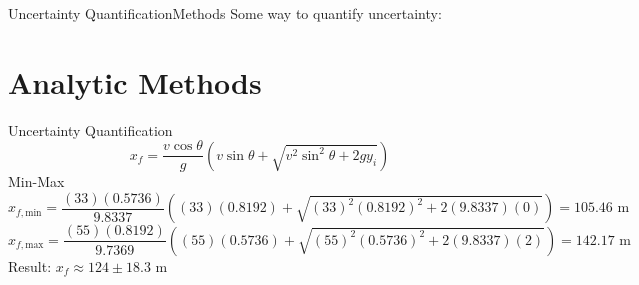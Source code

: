 \documentclass{beamer}
\begin{document}
\begin{frame}{Uncertainty Quantification}{Methods}\vspace{-20pt}
Some way to quantify uncertainty:
\end{frame}

\section{Analytic Methods}
\begin{frame}{Uncertainty Quantification}\vspace{-20pt}
\[x_f=\frac{v\cos{\theta}}{g}\left(v\sin\theta+\sqrt{v^2\sin^2\theta + 2gy_i}\right)\]
Min-Max
\tiny
\[x_{f,\text{min}}=\frac{(33)(0.5736)}{9.8337}\left((33)(0.8192)+\sqrt{(33)^2(0.8192)^2+2(9.8337)(0)}\right)= 105.46 \text{ m}\]
\[x_{f,\text{max}}=\frac{(55)(0.8192)}{9.7369}\left((55)(0.5736)+\sqrt{(55)^2(0.5736)^2+2(9.8337)(2)}\right)= 142.17 \text{ m}\]
\normalsize
Result: $x_f\approx124\pm18.3$ m \vspace{15pt}\\ \pause
{}
\end{frame}
\end{document}
